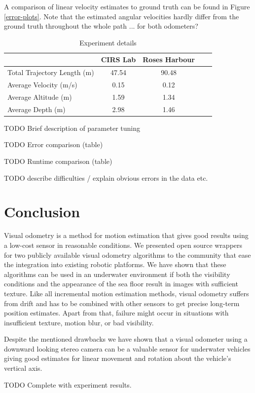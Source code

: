 \documentclass[conference]{IEEEtran}
\begin{document}
A comparison of linear velocity estimates to ground truth can be found in Figure \ref{error-plots}. Note that the estimated angular velocities hardly differ from the ground truth throughout the whole path ... for both odometers?

\begin{table}[ht]
  \caption{Experiment details}
  \label{experiment-details}
  \begin{tabular}{l*{3}{c}r}
    & \textbf{CIRS Lab} & \textbf{Roses Harbour}  \\
    \hline
    Total Trajectory Length (m)     & 47.54 & 90.48  \\[3pt]
    Average Velocity (m/s)          & 0.15 & 0.12  \\[3pt]
    Average Altitude (m)            & 1.59 & 1.34  \\[3pt]
    Average Depth (m)               & 2.98 & 1.46  \\[3pt]
  \end{tabular}
\end{table}

TODO Brief description of parameter tuning

TODO Error comparison (table)

TODO Runtime comparison (table)

TODO describe difficulties / explain obvious errors in the data etc.


\section{Conclusion
  \label{conclusion}
}

Visual odometry is a method for motion estimation that gives good results using a low-cost sensor in reasonable conditions. We presented open source wrappers for two publicly available visual odometry algorithms to the community that ease the integration into existing robotic platforms.
We have shown that these algorithms can be used in an underwater environment if both the visibility conditions and the appearance of the sea floor result in images with sufficient texture. Like all incremental motion estimation methods, visual odometry suffers from drift and has to be combined with other sensors to get precise long-term position estimates. Apart from that, failure might occur in situations with insufficient texture, motion blur, or bad visibility.

Despite the mentioned drawbacks we have shown that a visual odometer using a downward looking stereo camera can be a valuable sensor for underwater vehicles giving good estimates for linear movement and rotation about the vehicle's vertical axis.

TODO Complete with experiment results.




\end{document}
